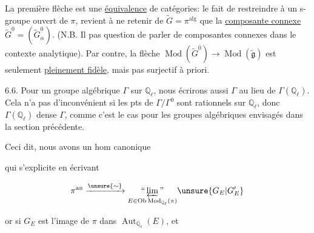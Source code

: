 La première flèche est une \uline{équivalence}  de catégories: le fait de restreindre   à un s-groupe ouvert de $\pi$, revient à  ne retenir de $\widetilde G=\pi^{\mathrm{alg}}$ que la \uline{composante connexe} $\widetilde G^0=(\widetilde G_\alpha^0)$. (N.B. Il  pas question de parler de composantes connexes dans le contexte analytique). Par contre, la flèche $\operatorname{Mod}(\widetilde G^0)\longrightarrow\operatorname{Mod}(\widetilde{\mathfrak g})$ est seulement \uline{pleinement fidèle}, mais pas    surjectif à priori.

6.6.  Pour un groupe algébrique  $\Gamma$ sur $\mathbb Q_\ell$, nous écrirons aussi $\Gamma$ au lieu de $\Gamma(\mathbb Q_\ell)$. Cela n'a pas d'inconvénient si les pts de $\Gamma/\Gamma^0$ sont rationnels sur $\mathbb Q_\ell$, donc $\Gamma(\mathbb Q_\ell)$ dense  $\Gamma$, comme c'est  le cas pour les groupes algébriques envisagés dans la section précédente.

Ceci dit, nous avons un hom canonique


qui s'explicite en écrivant

\[
\pi^{\mathrm{an}}\xrightarrow{\unsure{\sim}}\underset{E\in\operatorname{Ob}\operatorname{Mod}_{\mathbb Q_\ell}(\pi)}{\text{``}\varprojlim\text{''}}\unsure{G_E|G'_E}
\]

or si $G_E$ est l'image de $\pi$ dans $\operatorname{Aut}_{\mathbb Q_\ell}(E)$, et
